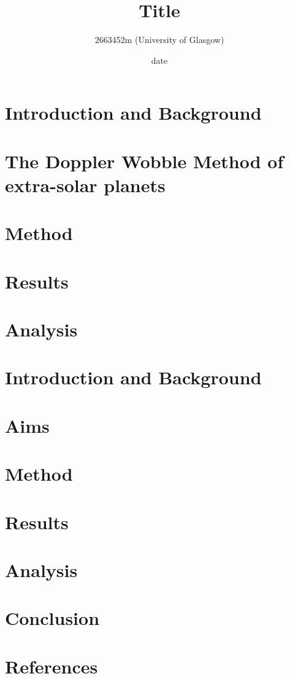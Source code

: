 \documentclass[]{article}
\title{\textbf{Title}}
\author{2663452m (University of Glasgow)}
\date{date}
\begin{document}
\maketitle

\begin{abstract}

\end{abstract}
\newpage





\section*{Introduction and Background}

\section*{The Doppler Wobble Method of extra-solar planets}




\section*{Method}




\section*{Results}



\section*{Analysis}




\newpage
\section*{Introduction and Background}

\section*{Aims}



\section*{Method}

\section*{Results}

\section*{Analysis}


\section*{Conclusion}

\section*{References}
\end{document}
